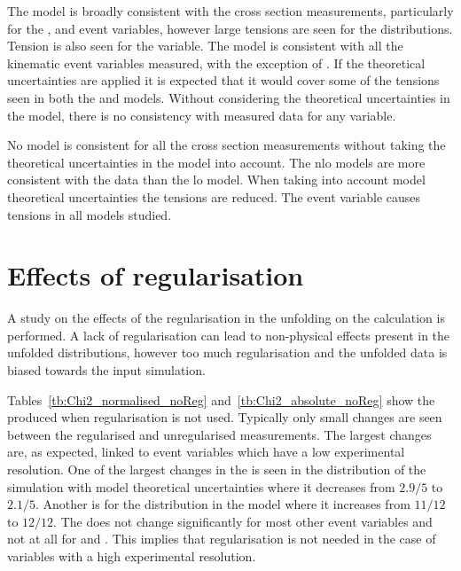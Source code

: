 The \powhegherwig{} model is broadly consistent with the cross section measurements, particularly for the \ptmiss{}, \LPT{} and \WPT{} event variables, however large tensions are seen for the \NJET{} distributions.
Tension is also seen for the \LETA{} variable.
The \mgamcFxFxpythia{} model is consistent with all the kinematic event variables measured, with the exception of \LETA{}.
If the theoretical uncertainties are applied it is expected that it would cover some of the tensions seen in both the \powhegherwig{} and \mgamcFxFxpythia{} models.
Without considering the theoretical uncertainties in the \mgamcMLMpythia{} model, there is no consistency with measured data for any variable. 

No model is consistent for all the cross section measurements without taking the theoretical uncertainties in the model into account.
The \acrshort{nlo} models are more consistent with the data than the \acrshort{lo} model.
When taking into account model theoretical uncertainties the tensions are reduced.
The \LETA{} event variable causes tensions in all models studied.


\section{Effects of regularisation} %
\label{sec:effects_of_regularisation}

A study on the effects of the regularisation in the unfolding on the \chisndf{} calculation is performed.
A lack of regularisation can lead to non-physical effects present in the unfolded distributions, however too much regularisation and the unfolded data is biased towards the input simulation.

Tables~\ref{tb:Chi2_normalised_noReg} and~\ref{tb:Chi2_absolute_noReg} show the \chisndf{} produced when regularisation is not used.
Typically only small changes are seen between the regularised and unregularised measurements.
The largest changes are, as expected, linked to event variables which have a low experimental resolution.
One of the largest changes in the \chisndf{} is seen in the \ptmiss{} distribution of the \powhegpythia{} simulation with model theoretical uncertainties where it decreases from $2.9/5$ to $2.1/5$.
Another is for the \HT{} distribution in the \mgamcFxFxpythia{} model where it increases from $11/12$ to $12/12$.
The \chisndf{} does not change significantly for most other event variables and not at all for \LPT{} and \LETA{}.
This implies that regularisation is not needed in the case of variables with a high experimental resolution. 








